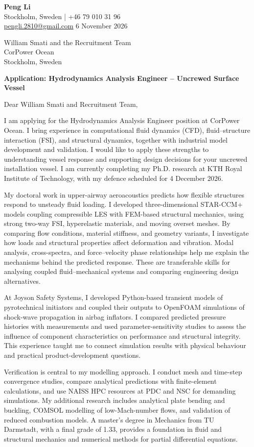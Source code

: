 \documentclass[a4paper,11pt]{article}
\begin{document}
{\LARGE\textbf{Peng Li}}\\[3pt]
Stockholm, Sweden \quad | \quad +46 79 010 31 96\\
\href{mailto:pengli.2810@gmail.com}{pengli.2810@gmail.com}
\hfill 6 November 2026

William Smati and the Recruitment Team\\
CorPower Ocean\\
Stockholm, Sweden

\textbf{Application: Hydrodynamics Analysis Engineer -- Uncrewed Surface Vessel}

Dear William Smati and Recruitment Team,

I am applying for the Hydrodynamics Analysis Engineer position at CorPower Ocean.
I bring experience in computational fluid dynamics (CFD), fluid--structure interaction (FSI),
and structural dynamics, together with industrial model development and validation.
I would like to apply these strengths to understanding vessel response and supporting design
decisions for your uncrewed installation vessel. I am currently completing my Ph.D. research
at KTH Royal Institute of Technology, with my defence scheduled for 4 December 2026.

My doctoral work in upper-airway aeroacoustics predicts how flexible structures respond to
unsteady fluid loading. I developed three-dimensional STAR-CCM+ models coupling compressible LES
with FEM-based structural mechanics, using strong two-way FSI, hyperelastic materials,
and moving overset meshes. By comparing flow conditions, material stiffness, and geometry
variants, I investigate how loads and structural properties affect deformation and vibration.
Modal analysis, cross-spectra, and force--velocity phase relationships help me explain the
mechanisms behind the predicted response. These are transferable skills for analysing
coupled fluid--mechanical systems and comparing engineering design alternatives.

At Joyson Safety Systems, I developed Python-based transient models of pyrotechnical
initiators and coupled their outputs to OpenFOAM simulations of shock-wave propagation
in airbag inflators. I compared predicted pressure histories with measurements and used
parameter-sensitivity studies to assess the influence of component characteristics on
performance and structural integrity. This experience taught me to connect simulation
results with physical behaviour and practical product-development questions.

Verification is central to my modelling approach. I conduct mesh and time-step convergence
studies, compare analytical predictions with finite-element calculations, and use NAISS HPC
resources at PDC and NSC for demanding simulations. My additional research includes
analytical plate bending and buckling, COMSOL modelling of low-Mach-number flows,
and validation of reduced combustion models. A master's degree in Mechanics from
TU Darmstadt, with a final grade of 1.33, provides a foundation in fluid and structural
mechanics and numerical methods for partial differential equations.
\end{document}
